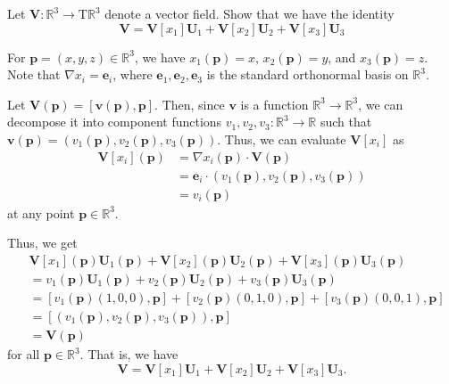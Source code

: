 \documentclass[12 pt, letterpaper]{hmcpset}
\begin{document}
\pagebreak

\begin{problem}[Problem 3.]
	Let $\mathbf V : \mathbb R^3 \to \mathrm T \mathbb R^3$ denote a vector field. Show that we have the identity
	\[
		\mathbf V = \mathbf V[x_1] \mathbf U_1 + \mathbf V[x_2] \mathbf U_2 + \mathbf V[x_3] \mathbf U_3
	\]
\end{problem}

\begin{solution}
	For $\mathbf p = (x, y, z) \in \mathbb R^3$, we have $x_1(\mathbf p) = x$, $x_2(\mathbf p) = y$, and $x_3(\mathbf p) = z$. Note that $\nabla x_i = \mathbf e_i$, where $\mathbf e_1, \mathbf e_2, \mathbf e_3$ is the standard orthonormal basis on $\mathbb R^3$. 

	Let $\mathbf V(\mathbf p) = [\mathbf v(\mathbf p), \mathbf p]$. Then, since $\mathbf v$ is a function $\mathbb R^3 \to \mathbb R^3$, we can decompose it into component functions $v_1, v_2, v_3 : \mathbb R^3 \to \mathbb R$ such that $\mathbf v(\mathbf p) = (v_1(\mathbf p), v_2(\mathbf p), v_3(\mathbf p))$. Thus, we can evaluate $\mathbf V[x_i]$ as
	\[
		\begin{split}
			\mathbf V[x_i](\mathbf p) & = \nabla x_i(\mathbf p) \cdot \mathbf V(\mathbf p) \\
						  & = \mathbf e_i \cdot (v_1(\mathbf p), v_2(\mathbf p), v_3(\mathbf p)) \\
						  & = v_i(\mathbf p)
		\end{split}
	\]
	at any point $\mathbf p \in \mathbb R^3$. 

	Thus, we get
	\[
		\begin{split}
			& \mathbf V[x_1] (\mathbf p) \mathbf U_1 (\mathbf p) + \mathbf V[x_2] (\mathbf p) \mathbf U_2 (\mathbf p) + \mathbf V[x_3] (\mathbf p) \mathbf U_3 (\mathbf p) \\
			& = v_1 (\mathbf p) \mathbf U_1 (\mathbf p) + v_2 (\mathbf p) \mathbf U_2 (\mathbf p) + v_3 (\mathbf p) \mathbf U_3 (\mathbf p) \\
			& = [v_1(\mathbf p)(1, 0, 0), \mathbf p] + [v_2 (\mathbf p) (0, 1, 0), \mathbf p] + [v_3(\mathbf p)(0, 0, 1), \mathbf p] \\
			& = [(v_1(\mathbf p), v_2(\mathbf p), v_3(\mathbf p)), \mathbf p] \\
			& = \mathbf V(\mathbf p)
		\end{split}
	\]
	for all $\mathbf p \in \mathbb R^3$. That is, we have
	\[
		\mathbf V = \mathbf V[x_1] \mathbf U_1 + \mathbf V[x_2] \mathbf U_2 + \mathbf V[x_3] \mathbf U_3.
	\]
\end{solution}
\end{document}
